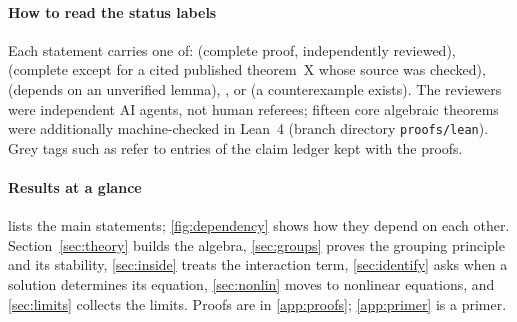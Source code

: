 

\paragraph{How to read the status labels} Each statement carries one of: \proved{} (complete proof, independently reviewed),  (complete except for a cited published theorem~X whose source was checked), \condl{} (depends on an unverified lemma),
\openq{}, or \falsest{} (a counterexample exists). The reviewers were independent AI agents, not human referees; fifteen core algebraic theorems were additionally machine-checked in Lean~4 (branch directory \texttt{proofs/lean}). Grey tags such as 
refer to entries of the claim ledger kept with the proofs.

\paragraph{Results at a glance}  lists the main statements; \cref{fig:dependency} shows how they depend on each other. Section~\ref{sec:theory} builds the algebra, \cref{sec:groups} proves the grouping principle and its stability,
\cref{sec:inside} treats the interaction term, \cref{sec:identify} asks when a solution determines its equation, \cref{sec:nonlin} moves to nonlinear equations, and \cref{sec:limits} collects the limits. Proofs are in \cref{app:proofs}; \cref{app:primer} is a primer.

